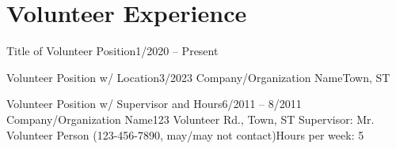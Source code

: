 
\section{Volunteer Experience}
  \resumeSubHeadingListStart

    \resumeSubheadingShort
      {Title of Volunteer Position}{1/2020 -- Present}
      \resumeItemListStart
      \resumeItemListEnd
      
    \resumeSubheading
      {Volunteer Position w/ Location}{3/2023}
      {Company/Organization Name}{Town, ST}
      \resumeItemListStart
      \resumeItemListEnd
 
    \resumeSubheadingWork
      {Volunteer Position w/ Supervisor and Hours}{6/2011 -- 8/2011}
      {Company/Organization Name}{123 Volunteer Rd., Town, ST}
      {Supervisor: Mr. Volunteer Person (123-456-7890, may/may not contact)}{Hours per week: 5}
      \resumeItemListStart
      \resumeItemListEnd
      
  \resumeSubHeadingListEnd
